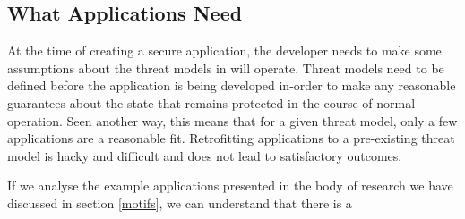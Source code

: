     
\subsection{What Applications Need}


At the time of creating a secure application, the developer needs to make
some assumptions about the threat models in will operate. Threat models need
to be defined before the application is being developed in-order to make any
reasonable guarantees about the state that remains protected in the course
of normal operation. Seen another way, this means that for a given threat
model, only a few applications are a reasonable fit. Retrofitting
applications to a pre-existing threat model is hacky and difficult and does
not lead to satisfactory outcomes.

If we analyse the example applications presented in the body of research we
have discussed in section \ref{motifs}, we can understand that there is a
